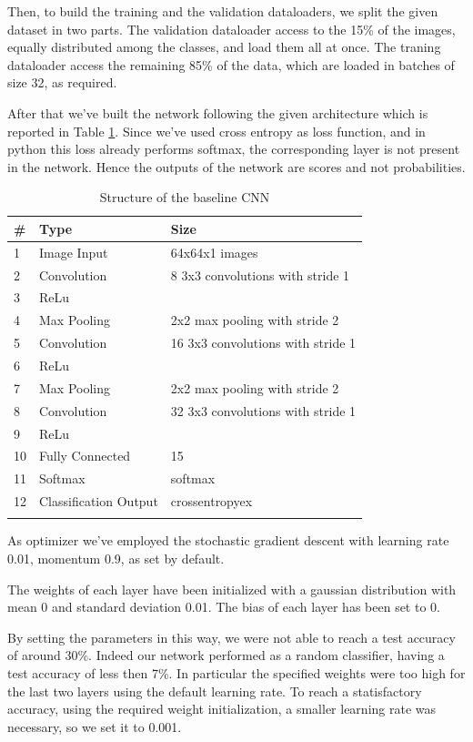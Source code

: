 \documentclass[12pt, a4paper]{report}
\begin{document}
Then, to build the training and the validation dataloaders, we split the given dataset in two parts. The validation dataloader access to the 15\% of the images, equally distributed among the classes, and load them all at once. The traning dataloader access the remaining 85\% of the data, which are loaded in batches of size 32, as required.

After that we've built the network following the given architecture which is reported in Table \ref{tab:baseline}. Since we've used cross entropy as loss function, and in python this loss already performs softmax, the corresponding layer is not present in the network. Hence the outputs of the network are scores and not probabilities.
	
\begin{table}[h!]
	\centering
	\caption{Structure of the baseline CNN}
	\begin{tabular}{lll}
		\# & Type & Size \\
		\midrule
		1 & Image Input & 64x64x1 images \\
		2 & Convolution & 8 3x3 convolutions with stride 1 \\
		3 & ReLu & \\
		4 & Max Pooling & 2x2 max pooling with stride 2 \\
		5 & Convolution & 16 3x3 convolutions with stride 1 \\
		6 & ReLu & \\
		7 & Max Pooling & 2x2 max pooling with stride 2 \\
		8 & Convolution & 32 3x3 convolutions with stride 1 \\
		9 & ReLu & \\
		10 & Fully Connected & 15 \\
		11 & Softmax & softmax \\
		12 & Classification Output & crossentropyex \\
		\bottomrule
		\label{tab:baseline}
	\end{tabular}
\end{table}
		
As optimizer we've employed the stochastic gradient descent with learning rate 0.01, momentum 0.9, as set by default.
	
The weights of each layer have been initialized with a gaussian distribution with mean 0 and standard deviation 0.01. The bias of each layer has been set to 0.

By setting the parameters in this way, we were not able to reach a test accuracy of around 30\%. Indeed our network performed as a random classifier, having a test accuracy of less then 7\%. In particular the specified weights were too high for the last two layers using the default learning rate. To reach a statisfactory accuracy, using the required weight initialization, a smaller learning rate was necessary, so we set it to 0.001.
\end{document}
